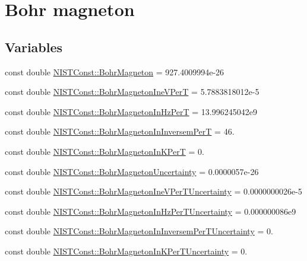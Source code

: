 \hypertarget{group___bohr_magneton}{}\section{Bohr magneton}
\label{group___bohr_magneton}
\subsection*{Variables}
\begin{DoxyCompactItemize}
\item 
const double \hyperlink{group___bohr_magneton_gaace59be8951a23257cedcbef8f320c66}{N\+I\+S\+T\+Const\+::\+Bohr\+Magneton} = 927.\+4009994e-\/26
\item 
const double \hyperlink{group___bohr_magneton_ga8b97d10b13a2c5de4f0d268370bc3c50}{N\+I\+S\+T\+Const\+::\+Bohr\+Magneton\+Ine\+V\+PerT} = 5.\+7883818012e-\/5
\item 
const double \hyperlink{group___bohr_magneton_ga0c3cc268d0e1abc4703ea8f2c11ccab8}{N\+I\+S\+T\+Const\+::\+Bohr\+Magneton\+In\+Hz\+PerT} = 13.\+996245042e9
\item 
const double \hyperlink{group___bohr_magneton_ga934ba6e90d5c57948d11224640830e86}{N\+I\+S\+T\+Const\+::\+Bohr\+Magneton\+In\+Inversem\+PerT} = 46.
\item 
const double \hyperlink{group___bohr_magneton_ga4fcb81eff2823748ae5fced898ecc0ec}{N\+I\+S\+T\+Const\+::\+Bohr\+Magneton\+In\+K\+PerT} = 0.
\item 
const double \hyperlink{group___bohr_magneton_gaf2591aab0321fec9056cc1a8479cb05b}{N\+I\+S\+T\+Const\+::\+Bohr\+Magneton\+Uncertainty} = 0.\+0000057e-\/26
\item 
const double \hyperlink{group___bohr_magneton_gaaecd1151f7f9e12288a05ba80fb94bbd}{N\+I\+S\+T\+Const\+::\+Bohr\+Magneton\+Ine\+V\+Per\+T\+Uncertainty} = 0.\+0000000026e-\/5
\item 
const double \hyperlink{group___bohr_magneton_ga6bbb08744c1f404415a645e006c75a0b}{N\+I\+S\+T\+Const\+::\+Bohr\+Magneton\+In\+Hz\+Per\+T\+Uncertainty} = 0.\+000000086e9
\item 
const double \hyperlink{group___bohr_magneton_ga266c7d0e03078702e0f64dafd2581055}{N\+I\+S\+T\+Const\+::\+Bohr\+Magneton\+In\+Inversem\+Per\+T\+Uncertainty} = 0.
\item 
const double \hyperlink{group___bohr_magneton_ga25a3b7882df7b01e29f7d0ec090a6f91}{N\+I\+S\+T\+Const\+::\+Bohr\+Magneton\+In\+K\+Per\+T\+Uncertainty} = 0.
\end{DoxyCompactItemize}


